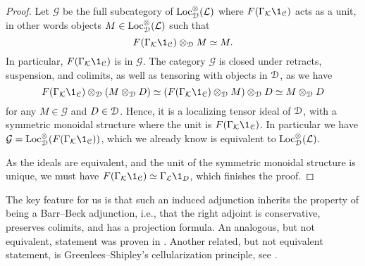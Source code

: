 \begin{proof}
    Let $\mathcal{G}$ be the full subcategory of $\operatorname{Loc}_{\EuScript{D}}^\otimes(\mathcal{L})$ where $F(\Gamma_\K\1_\C)$ acts as a unit, in other words objects $M\in \operatorname{Loc}_{\EuScript{D}}^\otimes(\mathcal{L})$ such that 
    \[F(\Gamma_\K\1_\C)\otimes_{\D} M\simeq M.\] 
    In particular, $F(\Gamma_\K\1_\C)$ is in $\mathcal{G}$. The category $\mathcal{G}$ is closed under retracts, suspension, and colimits, as well as tensoring with objects in $\EuScript{D}$, as we have 
    \[F(\Gamma_\K\1_\C) \otimes_\D (M\otimes_\D D)\simeq (F(\Gamma_\K\1_\C)\otimes_\D M) \otimes_\D D \simeq M\otimes_\D D\]
    for any $M\in \mathcal{G}$ and $D\in \EuScript{D}$. Hence, it is a localizing tensor ideal of $\EuScript{D}$, with a symmetric monoidal structure where the unit is $F(\Gamma_\K\1_\C)$. In particular we have $\mathcal{G} = \Loc_\D^\otimes(F(\Gamma_\K\1_\C))$, which we already know is equivalent to $\operatorname{Loc}_{\EuScript{D}}^\otimes(\mathcal{L}).$
    
    As the ideals are equivalent, and the unit of the symmetric monoidal structure is unique, we must have $F(\Gamma_\K\1_\C)\simeq \Gamma_\L \1_D$, which finishes the proof. 
\end{proof}

The key feature for us is that such an induced adjunction inherits the property of being a Barr--Beck adjunction, i.e., that the right adjoint is conservative, preserves colimits, and has a projection formula. An analogous, but not equivalent, statement was proven in \cite[4.5]{behrens-shaw_2020}. Another related, but not equivalent statement, is Greenlees--Shipley's cellularization principle, see \cite{greenlees-shipley_2013}. 

